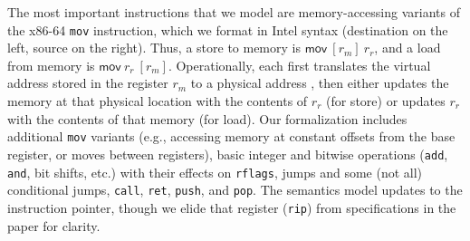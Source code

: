 The most important instructions that we model are memory-accessing variants of the x86-64 \lstinline|mov| instruction, which we format in Intel syntax
(destination on the left, source on the right).
Thus, a store to memory is $\textsf{mov}~[r_m]~r_r$, and a load from memory is $\textsf{mov}~r_r~[r_m]$.
Operationally, each first translates the virtual address stored in the register $r_m$ to a physical address ,
then either updates the memory at that physical location with the contents of $r_r$ (for store)
or updates $r_r$ with the contents of that memory (for load).
Our formalization includes
additional \lstinline|mov| variants (e.g., accessing memory at constant offsets from the base register, or moves between registers),
basic integer and bitwise operations (\lstinline|add|,
\lstinline|and|, bit shifts, etc.) with their effects on \lstinline|rflags|, jumps and some (not all) conditional jumps, \lstinline|call|, \lstinline|ret|, \lstinline|push|,
and \lstinline|pop|.
The semantics model updates to the instruction pointer, though we elide that register (\lstinline|rip|)
from specifications in the paper for clarity.
